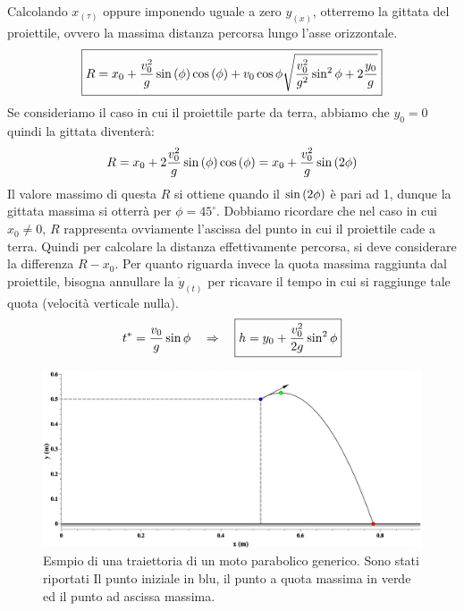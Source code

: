 Calcolando $x_{(\tau)}$ oppure imponendo uguale a zero $y_{(x)}$, otterremo
la gittata del proiettile, ovvero la massima distanza percorsa lungo
l'asse orizzontale.
\begin{equation}
    \boxed{R = x_0 + \frac{v_0^2}{g}\sin\left(\phi\right)\cos\left(\phi\right) +
    v_0\cos\phi\sqrt{\frac{v_0^2}{g^2}\sin^2\phi+2\frac{y_0}g}}
\label{eq:range}
\end{equation}
Se consideriamo il caso in cui il proiettile parte da terra,
abbiamo che $y_0 = 0$ quindi la gittata diventerà:
\begin{equation}
    R = x_0 +2\frac{v_0^2}{g}\sin\left(\phi\right)\cos\left(\phi\right) = x_0 + \frac{v_0^2}{g}\sin\left(2\phi\right)
\label{eq:range_0}
\end{equation}
Il valore massimo di questa $R$ si ottiene quando il $\sin\left(2\phi\right)$ è
pari ad 1, dunque la gittata massima si otterrà per $\phi = 45^\circ$.
Dobbiamo ricordare che nel caso in cui $x_0\ne0$, $R$ rappresenta
ovviamente l'ascissa del punto in cui il proiettile cade a terra.
Quindi per calcolare la distanza effettivamente percorsa, si deve
considerare la differenza $R-x_0$.
Per quanto riguarda invece la quota massima raggiunta dal proiettile,
bisogna annullare la $\dot y_{(t)}$ per ricavare il tempo in cui si
raggiunge tale quota (velocità verticale nulla). 
\begin{equation}
    t^* = \frac{v_0}{g}\sin\phi\quad\Rightarrow\quad\boxed{h = y_0 + \frac{v_0^2}{2g}\sin^2\phi}
\label{eq:h_max}
\end{equation}

\begin{figure}[t]
    \begin{center}
        \includegraphics[width=13cm]{images/Motopar1.png} 
        \caption{Esmpio di una traiettoria di un moto parabolico generico.
        Sono stati riportati Il punto iniziale in blu, il punto a quota
        massima in verde ed il punto ad ascissa massima.}
    \end{center}
\label{fig:MP}
\end{figure}